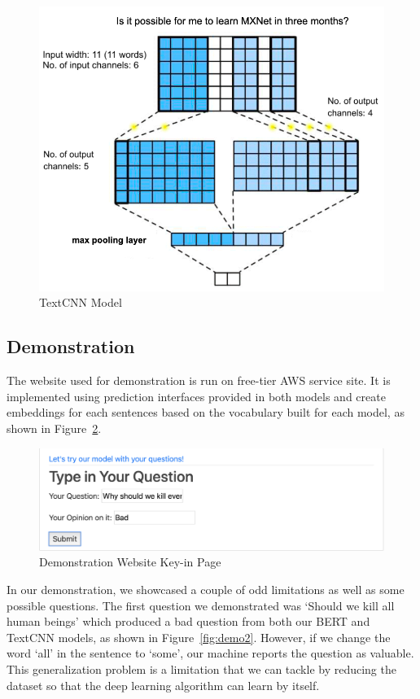 \documentclass{article}
\begin{document}
\begin{figure}[h!]
	\centering
	\includegraphics[scale=0.4]{flow.png}
	\caption{TextCNN Model}
	\label{fig:flow}
\end{figure}

\subsection{Demonstration}
The website used for demonstration is run on free-tier AWS service site. It is implemented using prediction interfaces provided in both models and create embeddings for each sentences based on the vocabulary built for each model, as shown in Figure~\ref{fig:demo1}.

\begin{figure}[h!]
	\centering
	\includegraphics[scale=0.5]{demo1.png}
	\caption{Demonstration Website Key-in Page}
	\label{fig:demo1}
\end{figure}

In our demonstration, we showcased a couple of odd limitations as well as some possible questions. The first question we demonstrated was ‘Should we kill all human beings’ which produced a bad question from both our BERT and TextCNN models, as shown in Figure~\ref{fig:demo2}. However, if we change the word ‘all’ in the sentence to ‘some’, our machine reports the question as valuable. This generalization problem is a limitation that we can tackle by reducing the dataset so that the deep learning algorithm can learn by itself. 
\end{document}
